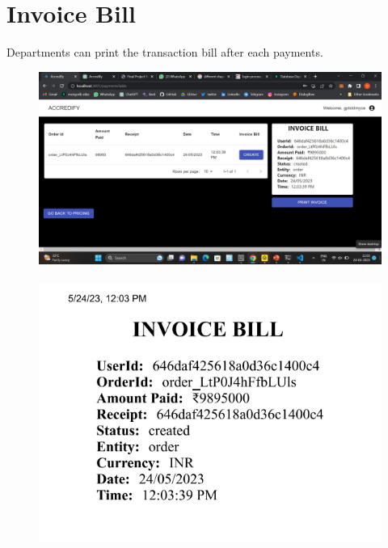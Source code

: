 \documentclass[a4paper,11pt]{report}
\begin{document}
\section{Invoice Bill}
Departments can print the transaction bill after each payments.
\begin{figure}[h]
	\centering
	\hspace{21pt}
	\includegraphics[width=.70\linewidth]{accredify8.png}
	\label{fig:logo.png}
\end{figure}
\begin{figure}[h]
	\centering
	\hspace{21pt}
	\includegraphics[width=.70\linewidth]{accredify10.png}
	\label{fig:logo.png}
\end{figure}
\end{document}
